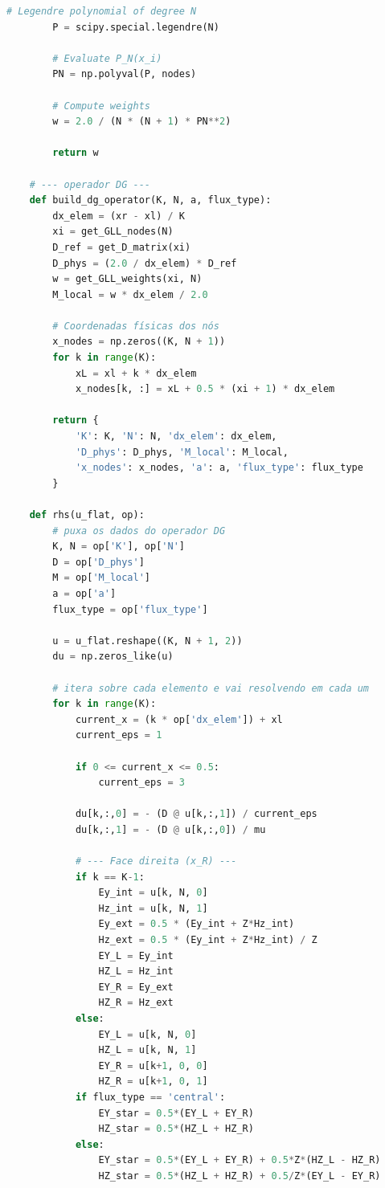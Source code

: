 \begin{anexosenv}
\begin{lstlisting}[language=Python, breaklines=true, basicstyle=\tiny]
        # Legendre polynomial of degree N
        P = scipy.special.legendre(N)

        # Evaluate P_N(x_i)
        PN = np.polyval(P, nodes)

        # Compute weights
        w = 2.0 / (N * (N + 1) * PN**2)

        return w
        
    # --- operador DG ---
    def build_dg_operator(K, N, a, flux_type):
        dx_elem = (xr - xl) / K
        xi = get_GLL_nodes(N)
        D_ref = get_D_matrix(xi)
        D_phys = (2.0 / dx_elem) * D_ref
        w = get_GLL_weights(xi, N)
        M_local = w * dx_elem / 2.0
        
        # Coordenadas físicas dos nós
        x_nodes = np.zeros((K, N + 1))
        for k in range(K):
            xL = xl + k * dx_elem
            x_nodes[k, :] = xL + 0.5 * (xi + 1) * dx_elem
            
        return {
            'K': K, 'N': N, 'dx_elem': dx_elem,
            'D_phys': D_phys, 'M_local': M_local,
            'x_nodes': x_nodes, 'a': a, 'flux_type': flux_type
        }
        
    def rhs(u_flat, op):
        # puxa os dados do operador DG
        K, N = op['K'], op['N']
        D = op['D_phys']
        M = op['M_local']
        a = op['a']
        flux_type = op['flux_type']
        
        u = u_flat.reshape((K, N + 1, 2))
        du = np.zeros_like(u)
        
        # itera sobre cada elemento e vai resolvendo em cada um
        for k in range(K):
            current_x = (k * op['dx_elem']) + xl
            current_eps = 1
            
            if 0 <= current_x <= 0.5:
                current_eps = 3
            
            du[k,:,0] = - (D @ u[k,:,1]) / current_eps
            du[k,:,1] = - (D @ u[k,:,0]) / mu
            
            # --- Face direita (x_R) ---
            if k == K-1: 
                Ey_int = u[k, N, 0]
                Hz_int = u[k, N, 1]
                Ey_ext = 0.5 * (Ey_int + Z*Hz_int)
                Hz_ext = 0.5 * (Ey_int + Z*Hz_int) / Z
                EY_L = Ey_int
                HZ_L = Hz_int
                EY_R = Ey_ext
                HZ_R = Hz_ext
            else:
                EY_L = u[k, N, 0]
                HZ_L = u[k, N, 1]
                EY_R = u[k+1, 0, 0]
                HZ_R = u[k+1, 0, 1]
            if flux_type == 'central':
                EY_star = 0.5*(EY_L + EY_R)
                HZ_star = 0.5*(HZ_L + HZ_R)
            else:
                EY_star = 0.5*(EY_L + EY_R) + 0.5*Z*(HZ_L - HZ_R)
                HZ_star = 0.5*(HZ_L + HZ_R) + 0.5/Z*(EY_L - EY_R)
                

\end{lstlisting}
\end{anexosenv}
